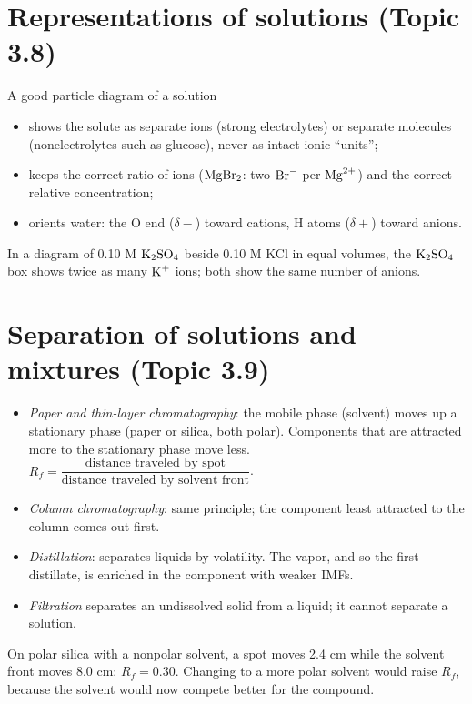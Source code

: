\documentclass[11pt]{article}
\begin{document}
\section{Representations of solutions (Topic 3.8)}\label{t:3.8}
A good particle diagram of a solution
\begin{itemize}
\item shows the solute as separate ions (strong electrolytes) or separate molecules (nonelectrolytes such as glucose), never as intact ionic ``units'';
\item keeps the correct ratio of ions ($\ce{MgBr2}$: two $\ce{Br-}$ per $\ce{Mg^2+}$) and the correct relative concentration;
\item orients water: the O end ($\delta-$) toward cations, H atoms ($\delta+$) toward anions.
\end{itemize}
 In a diagram of 0.10 M $\ce{K2SO4}$ beside 0.10 M KCl in equal volumes, the $\ce{K2SO4}$ box shows twice as many $\ce{K+}$ ions; both show the same number of anions.

\section{Separation of solutions and mixtures (Topic 3.9)}\label{t:3.9}
\begin{itemize}
\item \emph{Paper and thin-layer chromatography}: the mobile phase (solvent) moves up a stationary phase (paper or silica, both polar). Components that are attracted more to the stationary phase move less. $R_f = \dfrac{\text{distance traveled by spot}}{\text{distance traveled by solvent front}}$.
\item \emph{Column chromatography}: same principle; the component least attracted to the column comes out first.
\item \emph{Distillation}: separates liquids by volatility. The vapor, and so the first distillate, is enriched in the component with weaker IMFs.
\item \emph{Filtration} separates an undissolved solid from a liquid; it cannot separate a solution.
\end{itemize}
 On polar silica with a nonpolar solvent, a spot moves 2.4 cm while the solvent front moves 8.0 cm: $R_f = 0.30$. Changing to a more polar solvent would raise $R_f$, because the solvent would now compete better for the compound.
\end{document}
